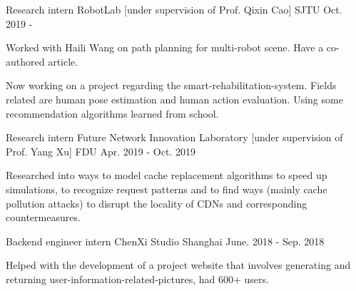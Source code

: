 

\begin{cventries}

  \cventry
    {Research intern} %
    {RobotLab [under supervision of Prof. Qixin Cao]} %
    {SJTU} %
    {Oct. 2019 - } %
    {
      \begin{cvitems} %
        \item {Worked with Haili Wang on path planning for multi-robot scene. Have a co-authored article.}
        \item {Now working on a project regarding the smart-rehabilitation-system. Fields related are human pose estimation and human action evaluation. Using some recommendation algorithms learned from school.}
      \end{cvitems}
    }


  \cventry
    {Research intern} %
    {Future Network Innovation Laboratory [under supervision of Prof. Yang Xu]} %
    {FDU} %
    {Apr. 2019 - Oct. 2019} %
    {
      \begin{cvitems} %
        \item {Researched into ways to model cache replacement algorithms to speed up simulations, to recognize request patterns and to find ways (mainly cache pollution attacks) to disrupt the locality of CDNs and corresponding countermeasures.}
      \end{cvitems}
    }

  \cventry
    {Backend engineer intern} %
    {ChenXi Studio} %
    {Shanghai} %
    {June. 2018 - Sep. 2018} %
    {
      \begin{cvitems} %
        \item {Helped with the development of a project website that involves generating and returning user-information-related-pictures, had 600+ users.}
      \end{cvitems}
    }


\end{cventries}
